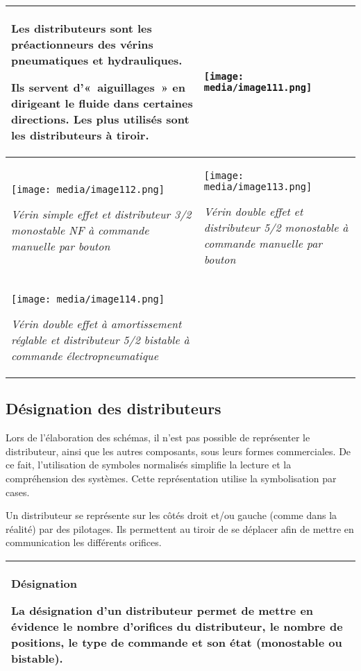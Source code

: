 \documentclass[
]{article}
\begin{document}
\begin{longtable}[]{@{}
  >{\raggedright\arraybackslash}p{}
  >{\raggedright\arraybackslash}p{}@{}}
\toprule
Les distributeurs sont les préactionneurs des vérins pneumatiques et
hydrauliques.

Ils servent d'«~aiguillages~» en dirigeant le fluide dans certaines
directions. Les plus utilisés sont les distributeurs à tiroir. &
\texttt{[image: media/image111.png]} \\
\midrule
\endhead
\texttt{[image: media/image112.png]}

\emph{Vérin simple effet et distributeur 3/2 monostable NF à commande
manuelle par bouton} &
\texttt{[image: media/image113.png]}

\emph{Vérin double effet et distributeur 5/2 monostable à commande
manuelle par bouton} \\
\texttt{[image: media/image114.png]}

\emph{Vérin double effet à amortissement réglable et distributeur 5/2
bistable à commande électropneumatique} & \\
\bottomrule
\end{longtable}

\hypertarget{duxe9signation-des-distributeurs}{%
\subsection{Désignation des
distributeurs}\label{duxe9signation-des-distributeurs}}

Lors de l'élaboration des schémas, il n'est pas possible de représenter
le distributeur, ainsi que les autres composants, sous leurs formes
commerciales. De ce fait, l'utilisation de symboles normalisés simplifie
la lecture et la compréhension des systèmes. Cette représentation
utilise la symbolisation par cases.

Un distributeur se représente sur les côtés droit et/ou gauche (comme
dans la réalité) par des pilotages. Ils permettent au tiroir de se
déplacer afin de mettre en communication les différents orifices.

\begin{longtable}[]{@{}
  >{\raggedright\arraybackslash}p{}@{}}
\toprule
\endhead
\textbf{Désignation}

La désignation d'un distributeur permet de mettre en évidence le nombre
d'orifices du distributeur, le nombre de positions, le type de commande
et son état (monostable ou bistable). \\
\bottomrule
\end{longtable}
\end{document}

